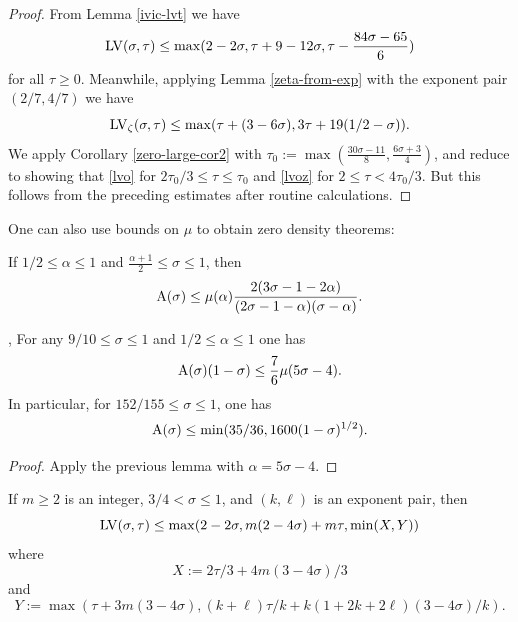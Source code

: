 \begin{proof}  From Lemma \ref{ivic-lvt} we have
$$  \mathrm{LV}(\sigma,\tau) \leq \max( 2-2\sigma, \tau + 9-12\sigma, \tau - \frac{84\sigma-65}{6})$$
for all $\tau \geq 0$.  Meanwhile, applying Lemma \ref{zeta-from-exp} with the exponent pair $(2/7,4/7)$ we have
$$ \mathrm{LV}_\zeta(\sigma,\tau) \leq \max( \tau + (3-6\sigma), 3\tau + 19(1/2-\sigma)).$$
We apply Corollary \ref{zero-large-cor2} with $\tau_0 := \max( \frac{30\sigma-11}{8}, \frac{6\sigma+3}{4} )$, and reduce to showing that \eqref{lvo} for $2\tau_0/3 \leq \tau \leq \tau_0$ and \eqref{lvoz} for $2 \leq \tau < 4\tau_0/3$.  But this follows from the preceding estimates after routine calculations.
\end{proof}

One can also use bounds on $\mu$ to obtain zero density theorems:

\begin{lemma}\label{zero_from_mu}\cite[Theorem 12.3]{montgomery_topics_1971} If $1/2 \leq \alpha \leq 1$ and $\frac{\alpha+1}{2} \leq \sigma \leq 1$, then
$$ \mathrm{A}(\sigma) \leq \mu(\alpha) \frac{2(3\sigma-1-2\alpha)}{(2\sigma-1-\alpha)(\sigma-\alpha)}.$$
\end{lemma}

\begin{corollary}\label{ivic-zero-density-large}\cite{montgomery_topics_1971}, \cite[Theorem 11.3]{ivic} For any $9/10 \leq \sigma \leq 1$ and $1/2 \leq \alpha \leq 1$ one has
    $$ \mathrm{A}(\sigma)(1-\sigma) \leq \frac{7}{6} \mu(5\sigma-4).$$
In particular, for $152/155 \leq \sigma \leq 1$, one has
$$ \mathrm{A}(\sigma) \leq \min( 35/36, 1600 (1-\sigma)^{1/2} ).$$
\end{corollary}

\literature
{}

\begin{proof} Apply the previous lemma with $\alpha = 5\sigma-4$.
\end{proof}

\begin{lemma}\label{a-ivt-1}  If $m \geq 2$ is an integer, $3/4 < \sigma \leq 1$, and $(k,\ell)$ is an exponent pair, then
$$ \mathrm{LV}(\sigma,\tau) \leq \max( 2-2\sigma, m(2-4\sigma) + m\tau, \min( X, Y ))$$
where
$$ X := 2\tau/3 + 4m(3-4\sigma)/3$$
and
$$ Y := \max( \tau + 3m(3-4\sigma), (k+\ell)\tau/k + k(1+2k+2\ell)(3-4\sigma)/k).$$
\end{lemma}

